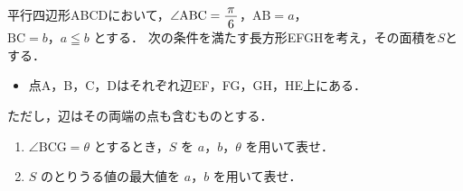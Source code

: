 ﻿\documentclass[../../../uem_mat_tok_q.tex]{subfiles}
\begin{document}
    平行四辺形ABCDにおいて，$\angle\mathrm{ABC}=\myfraca{\pi}{6}$，$\mathrm{AB}=a$，\\
    $\mathrm{BC}=b$，$a\leqq b$ とする．%
    次の条件を満たす長方形EFGHを考え，その面積を$S$とする．
    
    \begin{itemize}[label={条件：}, leftmargin=4\zw, labelsep=.7\zw, topsep=2pt]
        \item 点A，B，C，Dはそれぞれ辺EF，FG，GH，HE上にある．
    \end{itemize}
    ただし，辺はその両端の点も含むものとする．
    \begin{enumerate}
        \item $\angle\mathrm{BCG}=\theta$ とするとき，$S$ を $a$，$b$，$\theta$ を用いて表せ．
        \item $S$ のとりうる値の最大値を $a$，$b$ を用いて表せ．
    \end{enumerate}
\end{document}
